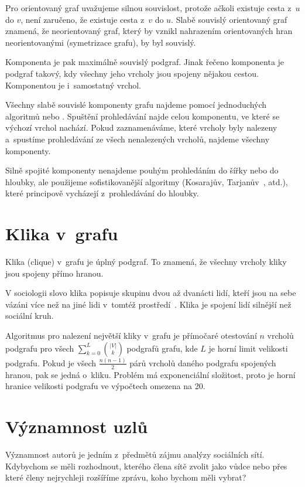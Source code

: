\documentclass{bakalarka}
\begin{document}
Pro orientovaný graf uvažujeme silnou souvislost, protože ačkoli existuje
cesta z~$u$ do $v$, není zaručeno, že existuje cesta z~$v$ do $u$.  Slabě
souvislý orientovaný graf znamená, že neorientovaný graf, který by vznikl
nahrazením orientovaných hran neorientovanými (symetrizace grafu), by byl
souvislý.

Komponenta je pak maximálně souvislý podgraf. Jinak řečeno komponenta je
podgraf takový, kdy všechny jeho vrcholy jsou spojeny nějakou cestou.
Komponentou je i~samostatný vrchol.


Všechny slabě souvislé komponenty grafu najdeme pomocí jednoduchých algoritmů
 nebo . Spuštění prohledávání najde
celou komponentu, ve které se výchozí vrchol nachází. Pokud zaznamenáváme,
které vrcholy byly nalezeny a~spustíme prohledávání ze všech nenalezených
vrcholů, najdeme všechny komponenty. 

Silně spojité komponenty nenajdeme pouhým prohledáním do šířky nebo do hloubky,
ale použijeme sofistikovanější algoritmy (Kosarajův,
Tarjanův~\citep{tarjan1972}, atd.), které principově vycházejí z~prohledávání
do hloubky.

\section{Klika v~grafu}
Klika (clique) v~grafu je úplný podgraf. To znamená, že všechny vrcholy kliky
jsou spojeny přímo hranou.

V sociologii slovo klika popisuje skupinu dvou až dvanácti lidí, kteří jsou na
sebe vázáni více než na jiné lidi v~tomtéž prostředí~\citep{salkind2008}.
Klika je spojení lidí silnější než sociální kruh.

Algoritmus pro nalezení největší kliky v~grafu je přímočaré otestování $n$
vrcholů podgrafu pro všech $\sum_{k = 0}^L {|V| \choose k}$ podgrafů grafu,
kde $L$ je horní limit velikosti podgrafu. Pokud je všech $\frac{n(n - 1)}{2}$
párů vrcholů daného podgrafu spojených hranou, pak se jedná o~kliku. Problém má
exponenciální složitost, proto je horní hranice velikosti podgrafu ve výpočtech
omezena na 20.

\section{Významnost uzlů}
Významnost autorů je jedním z~předmětů zájmu analýzy sociálních sítí. Kdybychom
se měli rozhodnout, kterého člena sítě zvolit jako vůdce nebo přes které členy
nejrychleji rozšíříme zprávu, koho bychom měli vybrat? 
\end{document}
